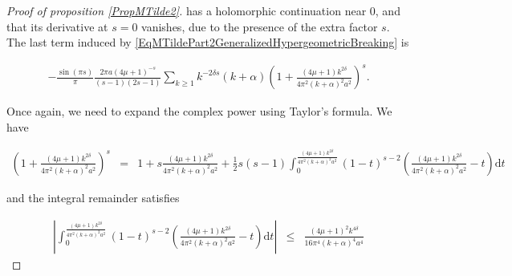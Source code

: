 \documentclass{jams-l}
\theoremstyle{definition}
\theoremstyle{remark}
\numberwithin{equation}{section}
\begin{document}
\begin{proof}[Proof of proposition \ref{PropMTilde2}]
                        \noindent has a holomorphic continuation near $0$, and that its derivative at $s=0$ vanishes, due to the presence of the extra factor $s$. The last term induced by \eqref{EqMTildePart2GeneralizedHypergeometricBreaking} is
                        
                        \[ \begin{array}{c}
                                - \frac{\sin \left( \pi s \right)}{\pi} \frac{2 \pi a \left( 4 \mu + 1 \right)^{-s}}{\left( s-1 \right) \left( 2s-1 \right)} \sum\limits_{k \geqslant 1} k^{- 2 \delta s} \left( k + \alpha \right) \left( 1 + \frac{\left( 4 \mu + 1 \right) k^{2 \delta}}{4 \pi^2 \left( k + \alpha \right)^2 a^2} \right)^s.
                            \end{array} \]
                        
                        \noindent Once again, we need to expand the complex power using Taylor's formula. We have
                        
                        \[ \begin{array}{lll}
                                \scriptstyle \left( 1 + \frac{\left( 4 \mu + 1 \right) k^{2 \delta}}{4 \pi^2 \left( k + \alpha \right)^2 a^2} \right)^s & \scriptstyle = & \scriptstyle 1 + s \frac{\left( 4 \mu + 1 \right) k^{2 \delta}}{4 \pi^2 \left( k + \alpha \right)^2 a^2} + \frac{1}{2} s \left( s-1 \right) \int_0^{\frac{\left( 4 \mu + 1 \right) k^{2 \delta}}{4 \pi^2 \left( k + \alpha \right)^2 a^2}} \left( 1-t \right)^{s-2} \left( \frac{\left( 4 \mu + 1 \right) k^{2 \delta}}{4 \pi^2 \left( k + \alpha \right)^2 a^2} - t \right) \mathrm{d}t
                            \end{array} \]
                        
                        \noindent and the integral remainder satisfies
                        
                        \[ \begin{array}{lll}
                                \left \vert \int_0^{\frac{\left( 4 \mu + 1 \right) k^{2 \delta}}{4 \pi^2 \left( k + \alpha \right)^2 a^2}} \left( 1-t \right)^{s-2} \left( \frac{\left( 4 \mu + 1 \right) k^{2 \delta}}{4 \pi^2 \left( k + \alpha \right)^2 a^2} - t \right) \mathrm{d}t \right \vert & \leqslant & \frac{\left( 4 \mu + 1 \right)^2 k^{4 \delta}}{16 \pi^4 \left( k + \alpha \right)^4 a^4}
                            \end{array} \]
                        

\end{proof}
\end{document}
